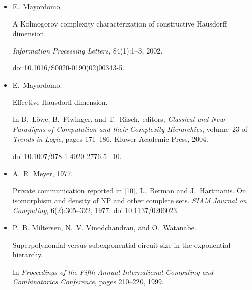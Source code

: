 \begin{itemize}
E. Mayordomo.


\emph{Contributions to the study of resource-bounded measure}.


PhD thesis, Universitat Politècnica de Catalunya, 1994.


URL:
https://eccc.weizmann.ac.il/static/books/Contributions\_to\_the\_Study\_of\_Resource\_Bounded\_Measure/.





\item[] 
[61]

E. Mayordomo.


A Kolmogorov complexity characterization of constructive
Hausdorff dimension.


\emph{Information Processing Letters}, 84(1):1–3, 2002.


doi:10.1016/S0020-0190(02)00343-5.





\item[] 
[62]

E. Mayordomo.


Effective Hausdorff dimension.


In B. Löwe, B. Piwinger, and T. Räsch, editors, \emph{Classical and New Paradigms of Computation and their Complexity Hierarchies},
volume 23 of \emph{Trends in Logic}, pages 171–186. Kluwer Academic Press,
2004.


doi:10.1007/978-1-4020-2776-5\_10.





\item[] 
[63]

A. R. Meyer, 1977.


Private communication reported in [10], L. Berman and
J. Hartmanis. On isomorphism and density of NP and other complete sets.
\emph{SIAM Journal on Computing}, 6(2):305–322, 1977.
doi:10.1137/0206023.





\item[] 
[64]

P. B. Miltersen, N. V. Vinodchandran, and O. Watanabe.


Superpolynomial versus subexponential circuit size in the exponential
hierarchy.


In \emph{Proceedings of the Fifth Annual International Computing and
Combinatorics Conference}, pages 210–220, 1999.



\end{itemize}
